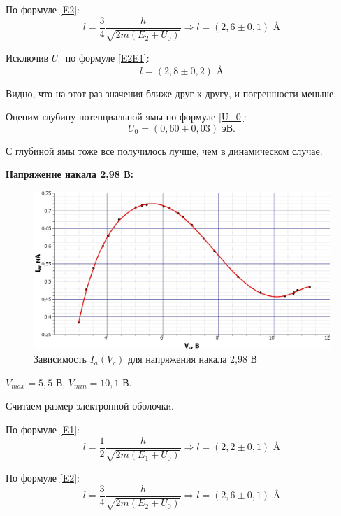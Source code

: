 \begin{enumerate}
		По формуле \eqref{E2}:
		\begin{equation*}
			l = \frac{3}{4}\frac{h}{\sqrt{2m(E_2 + U_0)}} \Longrightarrow l = (2,6 \pm 0,1) \text{ \AA}
		\end{equation*}
		
		Исключив $U_0$ по формуле \eqref{E2E1}:
		\begin{equation*}
			l = (2,8 \pm 0,2) \text{ \AA}
		\end{equation*}
	
		Видно, что на этот раз значения ближе друг к другу, и погрешности меньше.
	
		Оценим глубину потенциальной ямы по формуле \eqref{U_0}:
		\begin{equation*}
			U_0 = (0,60 \pm 0,03) \text{ эВ}.
		\end{equation*}
		
		С глубиной ямы тоже все получилось лучше, чем в динамическом случае.

	
		\textbf{Напряжение накала 2,98 В:}
		\begin{figure}[h!]
			\centering
			\includegraphics[width=\linewidth]{./Pictures/Ia(Vc)_298.jpg}
			\caption{Зависимость $I_a(V_c)$ для напряжения накала 2,98 В}
		\end{figure}
		
		$V_{max} = 5,5$ В, $V_{min} = 10,1$ В.
		
		Считаем размер электронной оболочки.
		
		По формуле \eqref{E1}:
		\begin{equation*}
			l = \frac{1}{2}\frac{h}{\sqrt{2m(E_1 + U_0)}} \Longrightarrow l = (2,2 \pm 0,1) \text{ \AA}
		\end{equation*}
		
		По формуле \eqref{E2}:
		\begin{equation*}
			l = \frac{3}{4}\frac{h}{\sqrt{2m(E_2 + U_0)}} \Longrightarrow l = (2,6 \pm 0,1) \text{ \AA}
		\end{equation*}
		

\end{enumerate}
